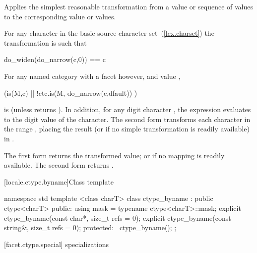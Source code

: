 \begin{itemdescr}
\pnum
\effects
Applies the simplest reasonable transformation from a
value or sequence of
values to the corresponding
value or values.

For any character  in the basic source character set~(\ref{lex.charset})
the transformation is such that

\begin{codeblock}
do_widen(do_narrow(c,0)) == c
\end{codeblock}

For any named
category with a
facet  however, and
value ,

\begin{codeblock}
(is(M,c) || !ctc.is(M, do_narrow(c,dfault)) )
\end{codeblock}

is
(unless
returns
).
In addition, for any digit character ,
the expression
evaluates to the digit value of the character.
The second form transforms each character
in the range
,
placing the result (or 
if no simple transformation is readily available) in
.

\pnum
\returns
The first form returns the transformed value; or 
if no mapping is readily available.
The second form returns .
\end{itemdescr}

[locale.ctype.byname]{Class template }

%
\begin{codeblock}
namespace std {
  template <class charT>
  class ctype_byname : public ctype<charT> {
  public:
    using mask = typename ctype<charT>::mask;
    explicit ctype_byname(const char*, size_t refs = 0);
    explicit ctype_byname(const string&, size_t refs = 0);
  protected:
   ~ctype_byname();
  };
}
\end{codeblock}

[facet.ctype.special]{ specializations}

